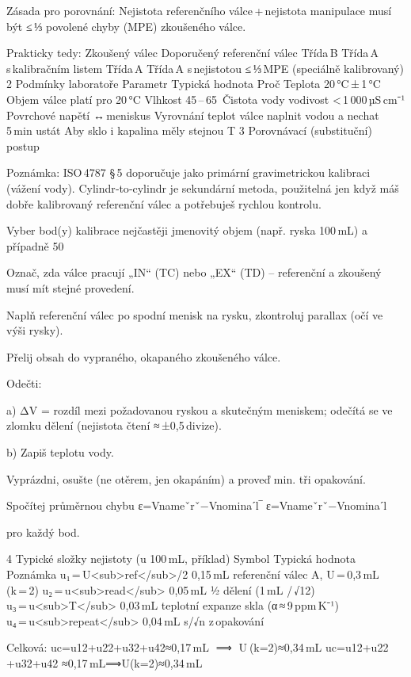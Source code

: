    Zásada pro porovnání:
    Nejistota referenčního válce + nejistota manipulace musí být ≤ ⅓ povolené chyby (MPE) zkoušeného válce.

Prakticky tedy:
Zkoušený válec	Doporučený referenční válec
Třída B	Třída A s kalibračním listem
Třída A	Třída A s nejistotou ≤ ⅓ MPE (speciálně kalibrovaný)
2  Podmínky laboratoře
Parametr	Typická hodnota	Proč
Teplota	20 °C ± 1 °C	Objem válce platí pro 20 °C
Vlhkost	45 – 65 %
Čistota vody	vodivost < 1 000 µS cm⁻¹	Povrchové napětí ↔ meniskus
Vyrovnání teplot	válce naplnit vodou a nechat 5 min ustát	Aby sklo i kapalina měly stejnou T
3  Porovnávací (substituční) postup

    Poznámka: ISO 4787 § 5 doporučuje jako primární gravimetrickou kalibraci (vážení vody). Cylindr‑to‑cylindr je sekundární metoda, použitelná jen když máš dobře kalibrovaný referenční válec a potřebuješ rychlou kontrolu.

    Vyber bod(y) kalibrace
    nejčastěji jmenovitý objem (např. ryska 100 mL) a případně 50 %

    Označ, zda válce pracují „IN“ (TC) nebo „EX“ (TD) – referenční a zkoušený musí mít stejné provedení.

    Naplň referenční válec po spodní menisk na rysku, zkontroluj parallax (očí ve výši rysky).

    Přelij obsah do vypraného, okapaného zkoušeného válce.

    Odečti:

        a) ΔV = rozdíl mezi požadovanou ryskou a skutečným meniskem; odečítá se ve zlomku dělení (nejistota čtení ≈ ±0,5 divize).

        b) Zapiš teplotu vody.

    Vyprázdni, osušte (ne otěrem, jen okapáním) a proveď min. tři opakování.

    Spočítej průměrnou chybu
    ε=Vnameˇrˇ−Vnominaˊl‾
    ε=Vnameˇrˇ​−Vnominaˊl​​

    pro každý bod.

4  Typické složky nejistoty (u 100 mL, příklad)
Symbol	Typická hodnota	Poznámka
u₁ = U<sub>ref</sub>/2	0,15 mL	referenční válec A, U = 0,3 mL (k = 2)
u₂ = u<sub>read</sub>	0,05 mL	½ dělení (1 mL / √12)
u₃ = u<sub>T</sub>	0,03 mL	teplotní expanze skla (α ≈ 9 ppm K⁻¹)
u₄ = u<sub>repeat</sub>	0,04 mL	s/√n z opakování

Celková:
uc=u12+u22+u32+u42≈0,17 mL    ⟹    U (k=2)≈0,34 mL
uc​=u12​+u22​+u32​+u42​
​≈0,17 mL⟹U(k=2)≈0,34 mL

